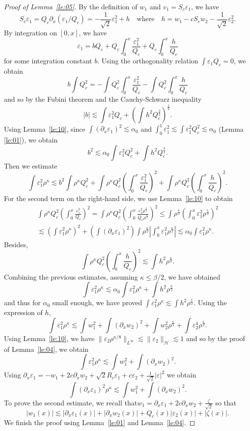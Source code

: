 \documentclass[11pt]{amsart}
\theoremstyle{remark}
\newcommand\cH{\mathcal{H}}
\newcommand\ep{\varepsilon}
\begin{document}
\begin{proof}[Proof of Lemma~\ref{le:05}]
By the definition of $w_1$ and $v_1=S_c \ep_1$, we have
\[
S_c \ep_1 = Q_c \partial_x(\ep_1/Q_c) = -\frac1{\sqrt{2}} \ep_1^2 + h \quad\mbox{where}\quad
h=w_1-cS_cw_2 - \frac1{\sqrt{2}} \ep_2^2.
\]
By integration on $[0,x]$, we have
\[
\ep_1 = b Q_c + Q_c \int_0^x \frac{\ep_1^2}{Q_c} + Q_c\int_0^x \frac{h}{Q_c}
\]
for some integration constant $b$.
Using the orthogonality relation $\int \ep_1 Q_c=0$, we obtain
\[
b \int Q_c^2 
= -\int Q_c^2 \int_0^x \frac{\ep_1^2}{Q_c} - \int Q_c^2 \int_0^x \frac{h}{Q_c} 
\]
and so by the Fubini theorem and the Cauchy-Schwarz inequality
\[
|b| \lesssim \int \ep_1^2 Q_c + \left(\int h^2 Q_c^\frac 32\right)^\frac12.
\]
Using Lemma~\ref{le:10}, since $\int (\partial_x\ep_1)^2\lesssim \alpha_0$
and $\int_0^1 \ep_1^2 \lesssim \int \ep_1^2 Q_c^2\lesssim \alpha_0$ (Lemma \ref{le:01}), we obtain
\[
b^2 \lesssim \alpha_0 \int \ep_1^2 Q_c^2 +\int h^2 Q_c^\frac 32.
\]
Then we estimate
\[
\int \ep_1^2 \rho^\kappa \lesssim b^2 \int \rho^\kappa Q_c^2 +\int \rho^\kappa Q_c^2 \left(\int_0^x \frac{\ep_1^2}{Q_c} \right)^2
+ \int \rho^\kappa Q_c^2\left(\int_0^x \frac{h}{Q_c}\right)^2.
\]
For the second term on the right-hand side, we use
Lemma~\ref{le:10} to obtain
\begin{multline*}
\int \rho^\kappa Q_c^2 \left(\int_0^x \frac{\ep_1^2}{Q_c} \right)^2
= \int \rho^\kappa Q_c^2 \left(\int_0^x \frac{\ep_1^2\rho^\frac\kappa4}
{Q_c\rho^\frac\kappa4} \right)^2
 \leq \int \rho^\frac\kappa2 \left(\int_0^x \ep_1^2 \rho^\frac\kappa4 \right)^2\\
\lesssim \left(\int \ep_1^2 \rho^\kappa\right)^2 
+\left(\int (\partial_x \ep_1)^2\right) \int \rho^\frac\kappa2 \left|\int_0^x \ep_1^2\rho^\frac\kappa2\right|
\lesssim \alpha_0 \int \ep_1^2 \rho^\kappa.
\end{multline*}
Besides,
\[
 \int \rho^\kappa Q_c^2\left(\int_0^x \frac{h}{Q_c}\right)^2
 \lesssim \int h^2 \rho^{\frac\kappa2}.
\]
Combining the previous estimates, assuming $\kappa\leq \beta/2$, we have obtained
\[
\int \ep_1^2 \rho^\kappa \lesssim \alpha_0 \int \ep_1^2 \rho^\kappa +\int h^2 \rho^{\frac\kappa2}
\]
and thus for $\alpha_0$ small enough, we have proved
$\int \ep_1^2 \rho^\kappa\lesssim \int h^2 \rho^{\frac\kappa2}$.
Using the expression of $h$,
\[
\int \ep_1^2 \rho^\kappa \lesssim \int w_1^2+\int (\partial_x w_2)^2 +\int w_2^2 \rho^{\frac\kappa2}
+ \int \ep_2^4 \rho^{\frac\kappa2}.
\]
Using Lemma~\ref{le:10}, we have
$\|\ep_2 \rho^{\kappa/8}\|_{L^\infty}\lesssim \|\ep_2\|_{\cH}\lesssim 1$
and so by the proof of Lemma~\ref{le:04}, we obtain
\[
\int \ep_1^2 \rho^\kappa \lesssim \int w_1^2+\int (\partial_x w_2)^2.
\]
Using
$
\partial_x \ep_1
= -w_1+2c\partial_x w_2+ \sqrt{2}R_c \ep_1+ c \ep_2+\frac{1}{\sqrt{2}} |\ep|^2 
$
we obtain
\[
\int (\partial_x \ep_1)^2 \rho^\kappa \lesssim \int w_1^2+\int (\partial_x w_2)^2.
\]
To prove the second estimate, we recall that$
w_1=\partial_x \ep_1+2c\partial_x w_2+\frac{\zeta}{\sqrt{2}}
$
so that 
\[
|w_1(x)|\lesssim |\partial_x \ep_1(x)|
+ |\partial_x w_2(x)| + Q_c(x) |\ep_2(x)|+
|\zeta(x)|.
\]
We finish the proof using 
Lemma~\ref{le:01} and Lemma~\ref{le:04}.
\end{proof}
\end{document}
